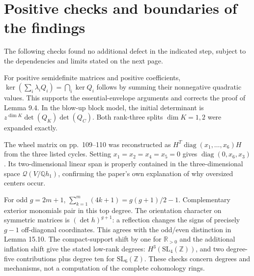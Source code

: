 \documentclass[10pt]{article}
\begin{document}
\section*{Positive checks and boundaries of the findings}
The following checks found no additional defect in the indicated step, subject to the dependencies and limits stated on the next page.\par
For positive semidefinite matrices and positive coefficients, \(\ker(\sum_i\lambda_iQ_i)=\bigcap_i\ker Q_i\) follows by summing their nonnegative quadratic values. This supports the essential-envelope arguments and corrects the proof of Lemma 9.4. In the blow-up block model, the initial determinant is \(z^{\dim K}\det(Q_K)\det(Q_C)\). Both rank-three splits \(\dim K=1,2\) were expanded exactly.\par
The wheel matrix on pp. 109–110 was reconstructed as \(H^T\operatorname{diag}(x_1,\ldots,x_6)H\) from the three listed cycles. Setting \(x_1=x_2=x_4=x_5=0\) gives \(\operatorname{diag}(0,x_6,x_3)\). Its two-dimensional linear span is properly contained in the three-dimensional space \(\mathcal Q(V/\mathbb Qh_1)\), confirming the paper’s own explanation of why oversized centers occur.\par
For odd \(g=2m+1\), \(\sum_{k=1}^m(4k+1)=g(g+1)/2-1\). Complementary exterior monomials pair in this top degree. The orientation character on symmetric matrices is \((\det h)^{g+1}\): a reflection changes the signs of precisely \(g-1\) off-diagonal coordinates. This agrees with the odd/even distinction in Lemma 15.10. The compact-support shift by one for \(\mathbb R_{>0}\) and the additional inflation shift give the stated low-rank degrees: \(H^3(\mathrm{SL}_4(\mathbb Z))\), and two degree-five contributions plus degree ten for \(\mathrm{SL}_6(\mathbb Z)\). These checks concern degrees and mechanisms, not a computation of the complete cohomology rings.\par
\end{document}
